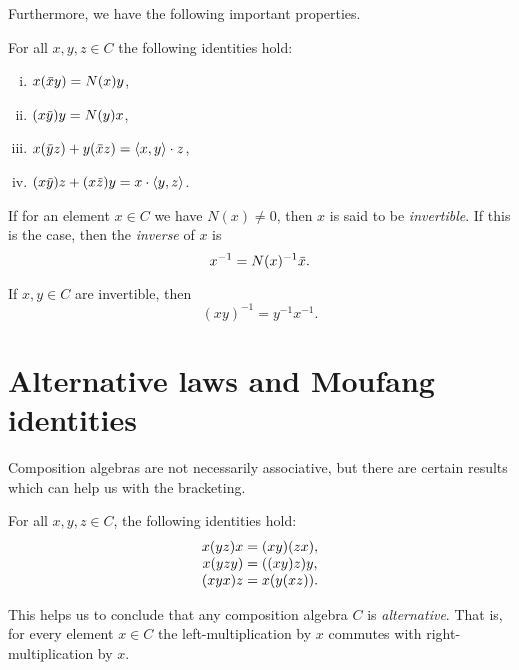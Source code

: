 Furthermore, we have the following important properties. 

\begin{lemma}
	For all $x,y,z \in C$ the following identities hold: 
	\begin{enumerate}[(i)]
		\item $x(\mathord{\mbox{\hspace*{0pt}}\,\overline{\!x\!\!\;}\!\:}\mbox{\hspace*{0pt}} y) = N(x) y$,
		\item $(x\mathord{\mbox{\hspace*{0pt}}\,\overline{\!y\!\!\;}\!\:}\mbox{\hspace*{0pt}}) y = N(y) x$,
		\item $x (\ovy z) + y (\ovx z) = \inner{x}{y} \cdot z$,
		\item $(x \ovy) z + (x \ovz) y = x\cdot \inner{y}{z}$. 
	\end{enumerate}	 
\end{lemma}

If for an element $x \in C$ we have $N(x)\neq 0$, then $x$ is said to be \textit{invertible}.
If this is the case, then the \textit{inverse} of $x$ is
\begin{equation}
	\label{eq:inverse}
	x^{-1} = N(x)^{-1} \mathord{\mbox{\hspace*{0pt}}\,\overline{\!x\!\!\;}\!\:}\mbox{\hspace*{0pt}}. 
\end{equation}

\begin{lemma}
	If $x,y \in C$ are invertible, then
	\begin{equation}
		(x y)^{-1} = y^{-1} x^{-1}.
	\end{equation}
\end{lemma}

\section{Alternative laws and Moufang identities}

Composition algebras are not necessarily associative, but there are certain results which 
can help us with the bracketing.

\begin{lemma}
	For all $x,y,z\in C$, the following identities hold:
	\begin{equation}
		\begin{array}{r@{\;}c@{\;}l}
			x(yz)x & = & (xy)(zx), \\
			x(yzy) & = & ((xy)z)y, \\
			(xyx)z & = & x(y(xz)).
		\end{array}
	\end{equation}
\end{lemma}

This helps us to conclude that any composition algebra $C$ is \textit{alternative}.
That is, for every element $x \in C$ the left-multiplication by $x$ commutes with 
right-multiplication by $x$. 

